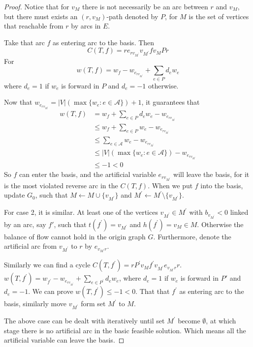\begin{proof}
					Notice that for $v_M$ there is not necessarily be an arc between $r$ and $v_M$, but there must exists an $(r, v_M)$-path denoted by $P$, for $M$ is the set of vertices that reachable from $r$ by arcs in $E$.

					Take that arc $f$ as entering arc to the basis. Then 
					\begin{equation}
						C(T, f) = re_{rv_{M^\prime}}v_{M^\prime}fv_MPr
					\end{equation}
					For
					\begin{equation}
						w(T, f) = w_f - w_{e_{rv_{M^\prime}}} + \sum_{e \in P} d_e w_e
					\end{equation}
					where $d_e = 1$ if $w_e$ is forward in $P$ and $d_e = -1$ otherwise.

					Now that $w_{e_{rv_{M^\prime}}} = |V|(\max\{w_e: e\in \mathcal{A}\}) + 1$, it guarantees that
					\begin{align}
						w(T, f) &= w_f + \sum_{e \in P} d_e w_e - w_{e_{rv_{M^\prime}}}\\
						        &\le w_f + \sum_{e \in P}w_e - w_{e_{rv_{M^\prime}}}\\
						        &\le \sum_{e \in \mathcal{A}}w_e - w_{e_{rv_{M^\prime}}}\\
						        &\le |V|(\max\{w_e: e\in \mathcal{A}\}) - w_{e_{rv_{M^\prime}}}\\
						        &\le -1 < 0 
					\end{align}
					So $f$ can enter the basis, and the artificial variable $e_{rv_{M^\prime}}$ will leave the basis, for it is the most violated reverse arc in the $C(T, f)$. When we put $f$ into the basis, update $G_0$, such that $M \leftarrow M \cup \{v_{M^\prime}\}$ and $M^\prime \leftarrow M^\prime \setminus \{v_{M^\prime}\}$.

					For case 2, it is similar. At least one of the vertices $v_{M^\prime} \in M^\prime$ with $b_{v_{M^\prime}} < 0$ linked by an arc, say $f\prime$, such that $t(f^\prime) = v_{M^\prime}$ and $h(f^\prime) = v_M \in M$. Otherwise the balance of flow cannot hold in the origin graph $G$. Furthermore, denote the artificial arc from $v_{M^\prime}$ to $r$ by $e_{v_{M^\prime}r}$.

					Similarly we can find a cycle $C(T, f^\prime) = rP^\prime v_M f^\prime v_{M^\prime}e_{v_{M^\prime}r}r$. $w(T, f^\prime) = w_{f^\prime} - w_{e_{rv_{M^\prime}}} + \sum_{e \in P^\prime} d_e w_e$, where $d_e = 1$ if $w_e$ is forward in $P\prime$ and $d_e = -1$. We can prove $w(T, f^\prime) \le -1 < 0$. That that $f^\prime$ as entering arc to the basis, similarly move $v_{M^\prime}$ form set $M^\prime$ to $M$.

					The above case can be dealt with iteratively until set $M^\prime$ become $\emptyset$, at which stage there is no artificial arc in the basic feasible solution. Which means all the artificial variable can leave the basis.
				\end{proof}

